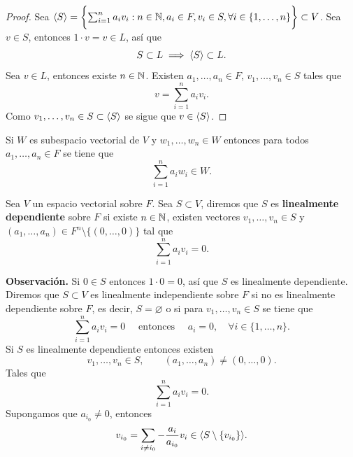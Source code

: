 \documentclass[12pt,a4paper]{book}
\begin{document}
    \begin{proof}
        Sea $\langle S \rangle=\biggl\{\sum_{i=1}^{n}a_{i}v_{i}:n\in\mathbb{N},a_{i}\in F,v_{i}\in S,\forall i\in\{1,\dots,n\}\biggr\}\subset V$.
        Sea $v\in S$, entonces $1\cdot v=v\in L$, así que
        \begin{equation*}
            S\subset L\implies\langle S \rangle\subset L.
        \end{equation*}
        Sea $v\in L$, entonces existe $n\in\mathbb{N}$. Existen $a_{1},\dots,a_{n}\in F$, $v_{1},\dots,v_{n}\in S$
        tales que
        \begin{equation*}
            v=\sum_{i=1}^{n}a_{i}v_{i}.
        \end{equation*}
        Como $v_{1},\dots,v_{n}\in S\subset\langle S \rangle$ se sigue que $v\in\langle S \rangle$.
    \end{proof}

    \begin{lema}
    \label{lema:2}
        Si $W$ es subespacio vectorial de $V$ y $w_{1},\dots,w_{n}\in W$ entonces para todos
        $a_{1},\dots,a_{n}\in F$ se tiene que
        \begin{equation*}
            \sum_{i=1}^{n}a_{i}w_{i}\in W.
        \end{equation*}
    \end{lema}

    \begin{definicion}
    \label{def:14}
        Sea $V$ un espacio vectorial sobre $F$. Sea $S\subset V$, diremos que $S$ es \textbf{linealmente
        dependiente} sobre $F$ si existe $n\in\mathbb{N}$, existen vectores $v_{1},\dots,v_{n}\in S$ y $(a_{1},\dots,a_{n})\in F^{n}\setminus\{(0,\dots,0)\}$
        tal que
        \begin{equation*}
            \sum_{i=1}^{n}a_{i}v_{i}=0.
        \end{equation*}
    \end{definicion}

    \textbf{Observación.} Si $0\in S$ entonces $1\cdot 0=0$, así que $S$ es linealmente dependiente.\\
    Diremos que $S\subset V$ es linealmente independiente sobre $F$ si no es linealmente
    dependiente sobre $F$, es decir, $S=\varnothing$  o si para $v_{1},\dots,v_{n}\in S$ se tiene que
    \begin{equation*}
        \sum_{i=1}^{n}a_{i}v_{i}=0\quad\text{ entonces }\quad a_{i}=0,\quad\forall i\in\{1,\dots,n\}.
    \end{equation*}
    Si $S$ es linealmente dependiente entonces existen
    \begin{equation*}
        v_{1},\dots,v_{n}\in S,\qquad (a_{1},\dots,a_{n})\neq(0,\dots,0).
    \end{equation*}
    Tales que
    \begin{equation*}
        \sum_{i=1}^{n}a_{i}v_{i}=0.
    \end{equation*}
    Supongamos que $a_{i_{0}}\neq0$, entonces
    \begin{equation*}
        v_{i_{0}}=\sum_{i\neq i_{0}}-\frac{a_{i}}{a_{i_{0}}}v_{i}\in\langle S\setminus\{v_{i_{0}}\} \rangle.
    \end{equation*}
\end{document}
